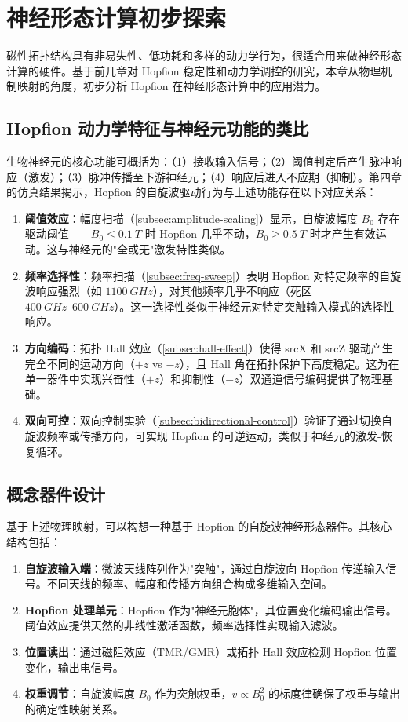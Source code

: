 \chapter{神经形态计算初步探索}

磁性拓扑结构具有非易失性、低功耗和多样的动力学行为，很适合用来做神经形态计算的硬件。基于前几章对 Hopfion 稳定性和动力学调控的研究，本章从物理机制映射的角度，初步分析 Hopfion 在神经形态计算中的应用潜力。


\section{Hopfion 动力学特征与神经元功能的类比}

生物神经元的核心功能可概括为：（1）接收输入信号；（2）阈值判定后产生脉冲响应（激发）；（3）脉冲传播至下游神经元；（4）响应后进入不应期（抑制）。第四章的仿真结果揭示，Hopfion 的自旋波驱动行为与上述功能存在以下对应关系：

\begin{enumerate}
  \item \textbf{阈值效应}：幅度扫描（\cref{subsec:amplitude-scaling}）显示，自旋波幅度 $B_0$ 存在驱动阈值——$B_0 \leq \SI{0.1}{T}$ 时 Hopfion 几乎不动，$B_0 \geq \SI{0.5}{T}$ 时才产生有效运动。这与神经元的"全或无"激发特性类似。
  \item \textbf{频率选择性}：频率扫描（\cref{subsec:freq-sweep}）表明 Hopfion 对特定频率的自旋波响应强烈（如 $\SI{1100}{GHz}$），对其他频率几乎不响应（死区 $\SIrange{400}{600}{GHz}$）。这一选择性类似于神经元对特定突触输入模式的选择性响应。
  \item \textbf{方向编码}：拓扑 Hall 效应（\cref{subsec:hall-effect}）使得 srcX 和 srcZ 驱动产生完全不同的运动方向（$+z$ vs $-z$），且 Hall 角在拓扑保护下高度稳定。这为在单一器件中实现兴奋性（$+z$）和抑制性（$-z$）双通道信号编码提供了物理基础。
  \item \textbf{双向可控}：双向控制实验（\cref{subsec:bidirectional-control}）验证了通过切换自旋波频率或传播方向，可实现 Hopfion 的可逆运动，类似于神经元的激发-恢复循环。
\end{enumerate}


\section{概念器件设计}

基于上述物理映射，可以构想一种基于 Hopfion 的自旋波神经形态器件。其核心结构包括：

\begin{enumerate}
  \item \textbf{自旋波输入端}：微波天线阵列作为"突触"，通过自旋波向 Hopfion 传递输入信号。不同天线的频率、幅度和传播方向组合构成多维输入空间。
  \item \textbf{Hopfion 处理单元}：Hopfion 作为"神经元胞体"，其位置变化编码输出信号。阈值效应提供天然的非线性激活函数，频率选择性实现输入滤波。
  \item \textbf{位置读出}：通过磁阻效应（TMR/GMR）或拓扑 Hall 效应检测 Hopfion 位置变化，输出电信号。
  \item \textbf{权重调节}：自旋波幅度 $B_0$ 作为突触权重，$v \propto B_0^2$ 的标度律确保了权重与输出的确定性映射关系。
\end{enumerate}


